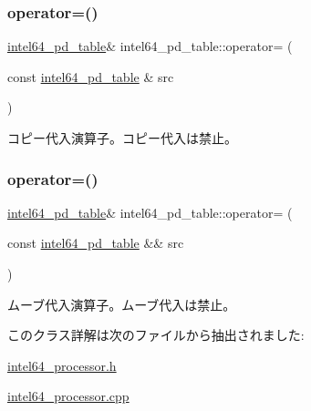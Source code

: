 \subsubsection{\texorpdfstring{operator=()}{operator=()}\hspace{0.1cm}{\footnotesize\ttfamily [1/2]}}
{\footnotesize\ttfamily \hyperlink{classintel64__pd__table}{intel64\+\_\+pd\+\_\+table}\& intel64\+\_\+pd\+\_\+table\+::operator= (\begin{DoxyParamCaption}\item[{const \hyperlink{classintel64__pd__table}{intel64\+\_\+pd\+\_\+table} \&}]{src }\end{DoxyParamCaption})\hspace{0.3cm}{\ttfamily [delete]}}

コピー代入演算子。コピー代入は禁止。 \hypertarget{classintel64__pd__table_a710a1060b39340cc9c12dcfd1e84f117}{}\label{classintel64__pd__table_a710a1060b39340cc9c12dcfd1e84f117} 
\subsubsection{\texorpdfstring{operator=()}{operator=()}\hspace{0.1cm}{\footnotesize\ttfamily [2/2]}}
{\footnotesize\ttfamily \hyperlink{classintel64__pd__table}{intel64\+\_\+pd\+\_\+table}\& intel64\+\_\+pd\+\_\+table\+::operator= (\begin{DoxyParamCaption}\item[{const \hyperlink{classintel64__pd__table}{intel64\+\_\+pd\+\_\+table} \&\&}]{src }\end{DoxyParamCaption})\hspace{0.3cm}{\ttfamily [delete]}}

ムーブ代入演算子。ムーブ代入は禁止。 

このクラス詳解は次のファイルから抽出されました\+:\begin{DoxyCompactItemize}
\item 
\hyperlink{intel64__processor_8h}{intel64\+\_\+processor.\+h}\item 
\hyperlink{intel64__processor_8cpp}{intel64\+\_\+processor.\+cpp}\end{DoxyCompactItemize}
